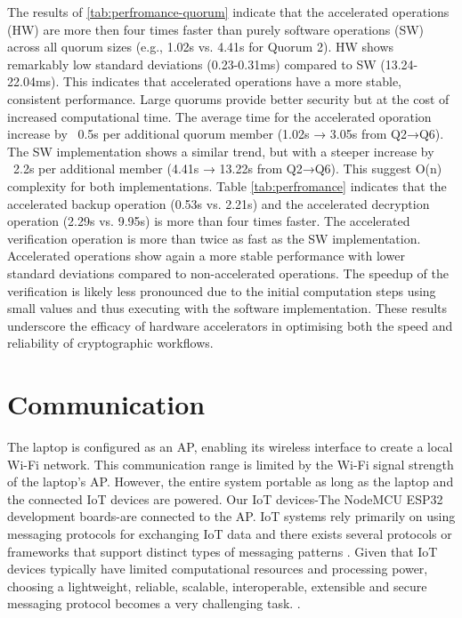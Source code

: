 The results of \ref{tab:perfromance-quorum} indicate that the accelerated operations (HW) are more then four times faster than purely software operations (SW) across all quorum sizes (e.g., 1.02s vs. 4.41s for Quorum 2). HW shows remarkably low standard deviations (0.23-0.31ms)  compared to SW (13.24-22.04ms). This indicates that accelerated operations have a more stable, consistent performance. Large quorums provide better security but at the cost of increased computational time. The average time for the accelerated oporation increase by ~0.5s per additional quorum member (1.02s → 3.05s from Q2→Q6). The SW implementation shows a similar trend, but with a steeper increase by ~2.2s per additional member (4.41s → 13.22s from Q2→Q6). This suggest O(n) complexity for both implementations. Table \ref{tab:perfromance} indicates that the accelerated backup operation (0.53s vs. 2.21s) and the accelerated decryption operation  (2.29s vs. 9.95s) is more than four times faster. The accelerated verification operation is more than twice as fast as the SW implementation. Accelerated operations show again a more stable performance with lower standard deviations compared to non-accelerated operations. The speedup of the verification is likely less pronounced due to the initial computation steps using small values and thus executing with the software implementation. These results underscore the efficacy of hardware accelerators in optimising both the speed and reliability of cryptographic workflows.  


\section{Communication}\label{sec:communication}
The laptop is configured as an \ac{AP}, enabling its wireless interface to create a local Wi-Fi network. This communication range is limited by the Wi-Fi signal strength of the laptop's \ac{AP}. However, the entire system portable as long as the laptop and the connected \ac{IoT} devices are powered. Our \ac{IoT} devices-The NodeMCU ESP32 development boards-are connected to the \ac{AP}. \ac{IoT} systems rely primarily on using messaging protocols for exchanging \ac{IoT} data and there exists several protocols or frameworks that support distinct types of messaging patterns . Given that \ac{IoT} devices typically have limited computational resources and processing power, choosing a lightweight, reliable, scalable, interoperable, extensible and secure messaging protocol becomes a very
challenging task. \cite[1]{protocols}.

